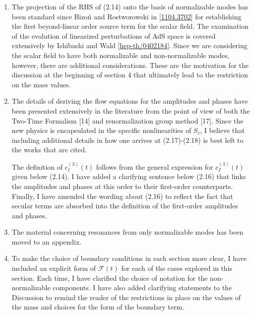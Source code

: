 \documentclass[11pt,letterpaper]{article}
\newcommand{\mc}{\mathcal}
\begin{document}
\begin{enumerate}
\begin{enumerate}
        \item The projection of the RHS of (2.14) onto the basis of normalizable modes has been standard since Bizo\'n and Rostworowski in [\href{https://arxiv.org/abs/1104.3702}{1104.3702}] for establishing the first beyond-linear order source term for the scalar field. The examination of the evolution of linearized perturbations of AdS space is covered extensively by Ishibashi and Wald [\href{https://arxiv.org/abs/hep-th/0402184}{hep-th/0402184}]. Since we are considering the scalar field to have both normalizable and non-normalizable modes, however, there are additional considerations. These are the motivation for the discussion at the beginning of section 4 that ultimately lead to the restriction on the mass values.
        \item The details of deriving the flow equations for the amplitudes and phases have been presented extensively in the literature from the point of view of both the Two-Time Formalism [14] and renormalization group method [17]. Since the new physics is encapsulated in the specific nonlinearities of $S_\ell$, I believe that including additional details in how one arrives at (2.17)-(2.18) is best left to the works that are cited. 
        
        The definition of $c^{(3)}_\ell (t)$ follows from the general expression for $c_I^{(3)}(t)$ given below (2.14). I have added a clarifying sentence below (2.16) that links the amplitudes and phases at this order to their first-order counterparts.
        Finally, I have amended the wording about (2.16) to reflect the fact that secular terms are absorbed into the definition of the first-order amplitudes and phases. 
        \item The material concerning resonances from only normalizable modes has been moved to an appendix.
        \item To make the choice of boundary conditions in each section more clear, I have included an explicit form of $\mc F(t)$ for each of the cases explored in this section. Each time, I have clarified the choice of notation for the non-normalizable components. I have also added clarifying statements to the Discussion to remind the reader of the restrictions in place on the values of the mass and choices for the form of the boundary term.
        

\end{enumerate}
\end{enumerate}
\end{document}
